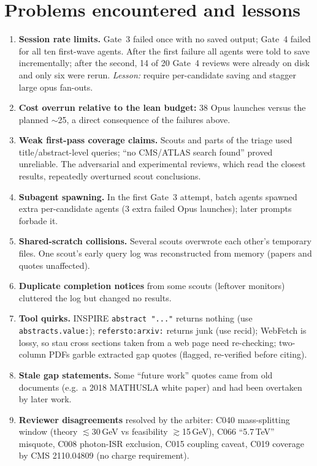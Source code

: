 \documentclass[11pt,a4paper]{article}
\begin{document}
\section{Problems encountered and lessons}
\begin{enumerate}
\item \textbf{Session rate limits.} Gate~3 failed once with no saved output; Gate~4 failed for all ten first-wave agents. After the first failure all agents were told to save incrementally; after the second, 14 of 20 Gate~4 reviews were already on disk and only six were rerun. \emph{Lesson:} require per-candidate saving and stagger large opus fan-outs.
\item \textbf{Cost overrun relative to the lean budget:} 38 Opus launches versus the planned $\sim$25, a direct consequence of the failures above.
\item \textbf{Weak first-pass coverage claims.} Scouts and parts of the triage used title/abstract-level queries; ``no CMS/ATLAS search found'' proved unreliable. The adversarial and experimental reviews, which read the closest results, repeatedly overturned scout conclusions.
\item \textbf{Subagent spawning.} In the first Gate~3 attempt, batch agents spawned extra per-candidate agents (3 extra failed Opus launches); later prompts forbade it.
\item \textbf{Shared-scratch collisions.} Several scouts overwrote each other's temporary files. One scout's early query log was reconstructed from memory (papers and quotes unaffected).
\item \textbf{Duplicate completion notices} from some scouts (leftover monitors) cluttered the log but changed no results.
\item \textbf{Tool quirks.} INSPIRE \texttt{abstract "..."} returns nothing (use \texttt{abstracts.value:}); \texttt{refersto:arxiv:} returns junk (use recid); WebFetch is lossy, so stau cross sections taken from a web page need re-checking; two-column PDFs garble extracted gap quotes (flagged, re-verified before citing).
\item \textbf{Stale gap statements.} Some ``future work'' quotes came from old documents (e.g.\ a 2018 MATHUSLA white paper) and had been overtaken by later work.
\item \textbf{Reviewer disagreements} resolved by the arbiter: C040 mass-splitting window (theory $\lesssim$30\,GeV vs feasibility $\gtrsim$15\,GeV), C066 ``5.7\,TeV'' misquote, C008 photon-ISR exclusion, C015 coupling caveat, C019 coverage by CMS 2110.04809 (no charge requirement).
\end{enumerate}
\end{document}
